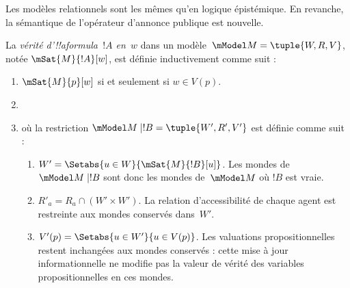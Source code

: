 \documentclass[../../../include/open-logic-section]{subfiles}
\begin{document}


Les modèles relationnels sont les mêmes qu'en logique épistémique.
En revanche, la sémantique de l'opérateur d'annonce publique est nouvelle.

\begin{defn}
  La \emph{vérité d'!!a{formula}~$!A$ en~$w$} dans
  un modèle~$\mModel M = \tuple{W, R, V}$, notée
  $\mSat{M}{!A}[w]$, est définie inductivement comme suit :
  \begin{enumerate}
  \item $\mSat{M}{p}[w]$ si et seulement si $w \in V(p)$.
  \item{}
  \item{}

  où la restriction $\mModel M \mid !B = \tuple{W', R', V'}$ est
  définie comme suit :
  \begin{enumerate}
    \item $W' = \Setabs{ u \in W}{\mSat{M}{!B}[u]}$. Les mondes de
      $\mModel M \mid !B$ sont donc les mondes de~$\mModel M$ où $!B$
      est vraie.
    \item $R'_a = R_a \cap (W' \times W')$. La relation d'accessibilité
      de chaque agent est restreinte aux mondes conservés dans~$W'$.
    \item $V'(p) = \Setabs{ u \in W'}{u \in V(p) }$. Les valuations
      propositionnelles restent inchangées aux mondes conservés :
      cette mise à jour informationnelle ne modifie pas la valeur de
      vérité des variables propositionnelles en ces mondes.
  \end{enumerate}
  \end{enumerate}
\end{defn}
\end{document}
